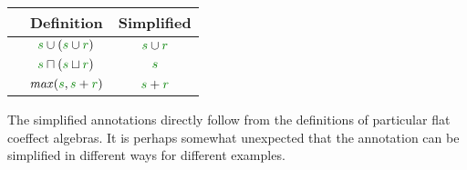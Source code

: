 \begin{table}[!h]
\begin{center}
\begin{tabular}{ | l | c | c |}
\hline
& \textbf{\footnotesize Definition\hspace{1em}} & \textbf{\footnotesize Simplified\hspace{1em}} \\ \hline
\hspace{-1em}{\footnotesize Implicit parameters} & $\cclrd{s} \cup (\cclrd{s} \cup \cclrd{r})$ & $\cclrd{s} \cup \cclrd{r}$ \\ \hline
\hspace{-1em}{\footnotesize Liveness} & $\cclrd{s} \sqcap (\cclrd{s} \sqcup \cclrd{r})$ & $\cclrd{s}$ \\ \hline
\hspace{-1em}{\footnotesize Data-flow} & $\mathit{max}(\cclrd{s}, \cclrd{s} + \cclrd{r})$ & $\cclrd{s} + \cclrd{r}$ \\ \hline
\end{tabular}
\end{center}

\vspace{-0.5em}
\label{tab:flat-simplelet}
\end{table}

\noindent
The simplified annotations directly follow from the definitions of particular flat coeffect 
algebras. It is perhaps somewhat unexpected that the annotation can be simplified in different
ways for different examples. 

